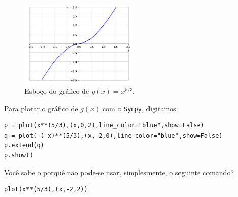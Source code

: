 \begin{resol}
\begin{enumerate}[a)]
    \begin{figure}[H]
      \centering
      \includegraphics[width=0.5\textwidth]{./cap_funcao/dados/fig_exeresol_funpot_graf/fig_exeresol_funpot_graf_b}
      \caption{Esboço do gráfico de $g(x) = x^{5/3}$.}
      \label{fig:exeresol_funpot_graf_b}
    \end{figure}

    \ifispython
    Para plotar o gráfico de $g(x)$ com o \verb+Sympy+, digitamos:
\begin{verbatim}
p = plot(x**(5/3),(x,0,2),line_color="blue",show=False)
q = plot(-(-x)**(5/3),(x,-2,0),line_color="blue",show=False)
p.extend(q)
p.show()
\end{verbatim}
    Você sabe o porquê não pode-se usar, simplesmente, o seguinte comando?
\begin{verbatim}
plot(x**(5/3),(x,-2,2))
\end{verbatim}
    \fi
  \end{enumerate}
\end{resol}

